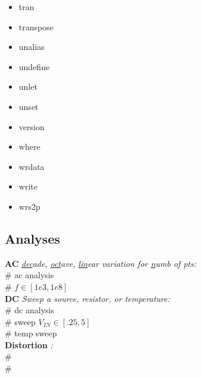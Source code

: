 {\begin{multicols}{4}
\begin{itemize}[leftmargin=0,label={}]
    \item tran
    \item transpose
    \item unalias
    \item undefine
    \item unlet
    \item unset
    \item version
    \item where
    \item wrdata
    \item write
    \item wrs2p
\end{itemize}\end{multicols}}




\subsection*{Analyses}

\textbf{AC} \textit{\underline{dec}ade, \underline{oct}ave, \underline{lin}ear variation for \underline{n}umb of pts:}\\
 \# {\scriptsize ac analysis} \\
 \# {\scriptsize $f \in [1e3,1e8]$ }\\[1mm]

\textbf{DC} \textit{Sweep a source, resistor, or temperature:}\\
 \# {\scriptsize dc analysis}\\
 \# {\scriptsize sweep $V_{IN} \in [.25,5]$}\\
 \# {\scriptsize temp sweep} \\

\textbf{Distortion} \textit{:}\\
 \# {\scriptsize }\\
 \# {\scriptsize }\\

